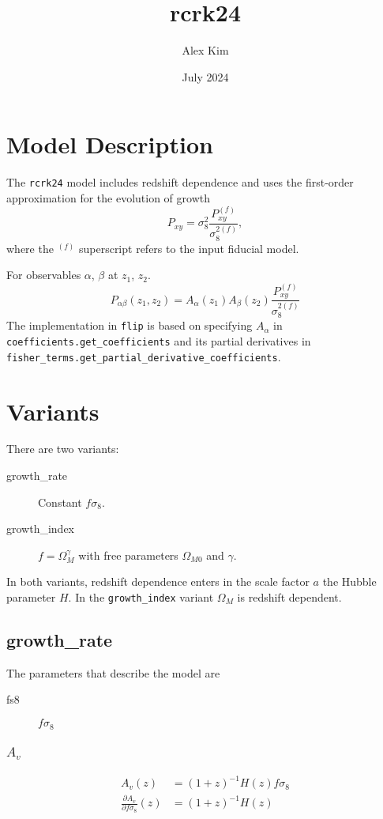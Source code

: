 \documentclass{article}
\title{rcrk24}
\author{Alex Kim}
\date{July 2024}
\begin{document}
 \maketitle

\section{Model Description}
The {\tt rcrk24} model includes redshift dependence and uses the first-order approximation for the evolution of growth
\begin{equation}
{P_{xy}} = {\sigma^2_8} \frac{P^{(f)}_{xy}}{\sigma^{2(f)}_8},
\end{equation}
where the ${}^{(f)}$ superscript refers to the input fiducial model.

For observables $\alpha$, $\beta$ at $z_1$, $z_2$.
\begin{equation}
P_{\alpha\beta}(z_1,z_2)= A_\alpha(z_1) A_\beta(z_2) \frac{P^{(f)}_{xy}}{\sigma^{2(f)}_8}
\end{equation}
The implementation in {\tt flip} is based on specifying $A_\alpha$ in {\tt coefficients.get\_coefficients} and
its partial derivatives in {\tt fisher\_terms.get\_partial\_derivative\_coefficients}.

\section{Variants}

There are two variants:
\begin{description}
\item[growth\_rate] Constant $f\sigma_8$.
\item[growth\_index] $f=\Omega_{M}^\gamma$ with free parameters $\Omega_{M0}$ and $\gamma$.
\end{description}
In both variants, redshift dependence enters in the scale factor $a$ the Hubble parameter $H$.
In the {\tt growth\_index} variant $\Omega_M$ is redshift dependent.

\subsection{growth\_rate}

The parameters that describe the model are 
\begin{description}
\item[fs8] $f\sigma_8$
\end{description}

\subsubsection{$A_v$}
\begin{align}
A_{v}(z) & = (1+z)^{-1} H(z) f\sigma_8 \\
\frac{\partial A_{v}}{\partial f\sigma_8} (z) & = (1+z)^{-1} H(z)
\end{align}
\end{document}
